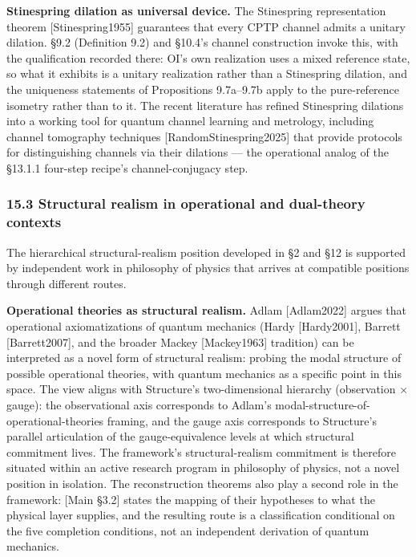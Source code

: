 \documentclass[
]{article}
\begin{document}
\textbf{Stinespring dilation as universal device.} The Stinespring
representation theorem {[}Stinespring1955{]} guarantees that every CPTP
channel admits a unitary dilation. §9.2 (Definition 9.2) and §10.4's
channel construction invoke this, with the qualification recorded there:
OI's own realization uses a mixed reference state, so what it exhibits
is a unitary realization rather than a Stinespring dilation, and the
uniqueness statements of Propositions 9.7a--9.7b apply to the
pure-reference isometry rather than to it. The recent literature has
refined Stinespring dilations into a working tool for quantum channel
learning and metrology, including channel tomography techniques
{[}RandomStinespring2025{]} that provide protocols for distinguishing
channels via their dilations --- the operational analog of the §13.1.1
four-step recipe's channel-conjugacy step.

\hypertarget{structural-realism-in-operational-and-dual-theory-contexts}{%
\subsubsection{15.3 Structural realism in operational and dual-theory
contexts}\label{structural-realism-in-operational-and-dual-theory-contexts}}

The hierarchical structural-realism position developed in §2 and §12 is
supported by independent work in philosophy of physics that arrives at
compatible positions through different routes.

\textbf{Operational theories as structural realism.} Adlam
{[}Adlam2022{]} argues that operational axiomatizations of quantum
mechanics (Hardy {[}Hardy2001{]}, Barrett {[}Barrett2007{]}, and the
broader Mackey {[}Mackey1963{]} tradition) can be interpreted as a novel
form of structural realism: probing the modal structure of possible
operational theories, with quantum mechanics as a specific point in this
space. The view aligns with Structure's two-dimensional hierarchy
(observation × gauge): the observational axis corresponds to Adlam's
modal-structure-of-operational-theories framing, and the gauge axis
corresponds to Structure's parallel articulation of the
gauge-equivalence levels at which structural commitment lives. The
framework's structural-realism commitment is therefore situated within
an active research program in philosophy of physics, not a novel
position in isolation. The reconstruction theorems also play a second
role in the framework: {[}Main §3.2{]} states the mapping of their
hypotheses to what the physical layer supplies, and the resulting route
is a classification conditional on the five completion conditions, not
an independent derivation of quantum mechanics.
\end{document}
